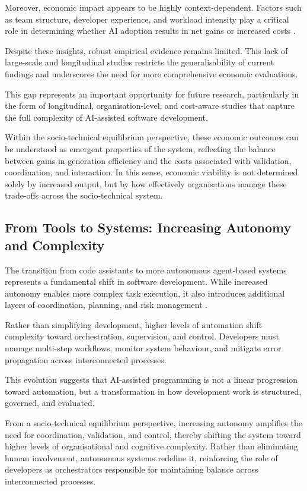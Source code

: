 \documentclass[conference]{IEEEtran}
\begin{document}
Moreover, economic impact appears to be highly context-dependent. Factors such as team structure, developer experience, and workload intensity play a critical role in determining whether AI adoption results in net gains or increased costs \cite{rodriguez_comparative_2025, song_impact_2024}.

Despite these insights, robust empirical evidence remains limited. This lack of large-scale and longitudinal studies restricts the generalisability of current findings and underscores the need for more comprehensive economic evaluations.

This gap represents an important opportunity for future research, particularly in the form of longitudinal, organisation-level, and cost-aware studies that capture the full complexity of AI-assisted software development.

Within the socio-technical equilibrium perspective, these economic outcomes can be understood as emergent properties of the system, reflecting the balance between gains in generation efficiency and the costs associated with validation, coordination, and interaction. In this sense, economic viability is not determined solely by increased output, but by how effectively organisations manage these trade-offs across the socio-technical system.

\subsection{From Tools to Systems: Increasing Autonomy and Complexity}

The transition from code assistants to more autonomous agent-based systems represents a fundamental shift in software development. While increased autonomy enables more complex task execution, it also introduces additional layers of coordination, planning, and risk management \cite{zhong_developer-llm_2025}.

Rather than simplifying development, higher levels of automation shift complexity toward orchestration, supervision, and control. Developers must manage multi-step workflows, monitor system behaviour, and mitigate error propagation across interconnected processes.

This evolution suggests that AI-assisted programming is not a linear progression toward automation, but a transformation in how development work is structured, governed, and evaluated.

From a socio-technical equilibrium perspective, increasing autonomy amplifies the need for coordination, validation, and control, thereby shifting the system toward higher levels of organisational and cognitive complexity. Rather than eliminating human involvement, autonomous systems redefine it, reinforcing the role of developers as orchestrators responsible for maintaining balance across interconnected processes.
\end{document}

